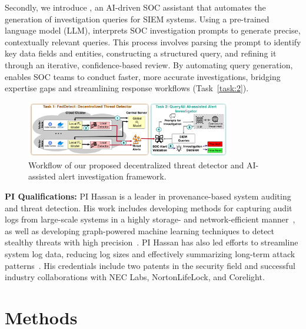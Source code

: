 Secondly, we introduce \Sysb, an AI-driven SOC assistant that automates the generation of investigation queries for SIEM systems. Using a pre-trained language model (LLM), \Sysb interprets SOC investigation prompts to generate precise, contextually relevant queries. This process involves parsing the prompt to identify key data fields and entities, constructing a structured query, and refining it through an iterative, confidence-based review. By automating query generation, \Sysb enables SOC teams to conduct faster, more accurate investigations, bridging expertise gaps and streamlining response workflows (Task~\ref{task:2}).







\begin{figure}[t!]
    \centering \includegraphics[width=0.80\textwidth]{fig/arch-e2e-cdr.pdf}
    \caption{Workflow of our proposed decentralized threat detector and AI-assisted alert investigation framework. }
    \label{fig:arch}
    \end{figure}



\noindent\textbf{PI Qualifications: }
PI Hassan is a leader in provenance-based system auditing and threat detection. His work includes developing methods for capturing audit logs from large-scale systems in a highly storage- and network-efficient manner~\cite{winnower2018,omegalog2020,inam2022faust,dossier,bates2017transparent,paccagnella2020custos}, as well as developing graph-powered machine learning techniques to detect stealthy threats with high precision~\cite{provthings2018,provdetector2020,rapsheet2020,flash2024}. PI Hassan has also led efforts to streamline system log data, reducing log sizes and effectively summarizing long-term attack patterns~\cite{rapsheet2020,swift2020,inam2023sok,nodoze2019,approx}. His credentials include two patents in the security field and successful industry collaborations with NEC Labs, NortonLifeLock, and Corelight.


\section*{Methods}


